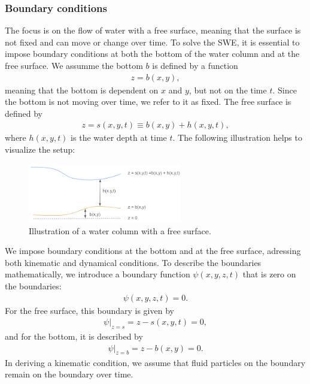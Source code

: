 \subsubsection*{Boundary conditions}
The focus is on the flow of water with a free surface, meaning that the surface is not fixed and can move or change over time.
To solve the SWE, it is essential to impose boundary conditions at both the bottom of the water column and at the free surface.
We assumme the bottom $b$ is defined by a function
\begin{align*}
    z = b(x,y),
\end{align*}
meaning that the bottom is dependent on $x$ and $y$, but not on the time $t$.
Since the bottom is not moving over time, we refer to it as fixed.
The free surface is defined by 
\begin{align*}
    z = s(x,y,t) \equiv b(x,y) + h(x,y,t),
\end{align*}
where $h(x,y,t)$ is the water depth at time $t$.
The following illustration helps to visualize the setup:
\begin{figure}[H]
    \centering
    \includegraphics[width=0.6\textwidth]{figs/water-column-bc.png}
    \caption{Illustration of a water column with a free surface.}\label{fig:water_column_bc}
\end{figure}
We impose boundary conditions at the bottom and at the free surface, adressing both kinematic and dynamical conditions.
To describe the boundaries mathematically, we introduce a boundary function $\psi(x,y,z,t)$ that is zero on the boundaries:
\begin{align*}
    \psi(x,y,z,t) = 0.
\end{align*}
For the free surface, this boundary is given by
\begin{align}\label{eq:psi_free_surface}
    \psi|_{z = s} = z - s(x,y,t) = 0,
\end{align}
and for the bottom, it is described by
\begin{align}\label{eq:psi_bottom}
    \psi|_{z = b} = z - b(x,y) = 0.
\end{align}
In deriving a kinematic condition, we assume that fluid particles on the boundary remain on the boundary over time.
